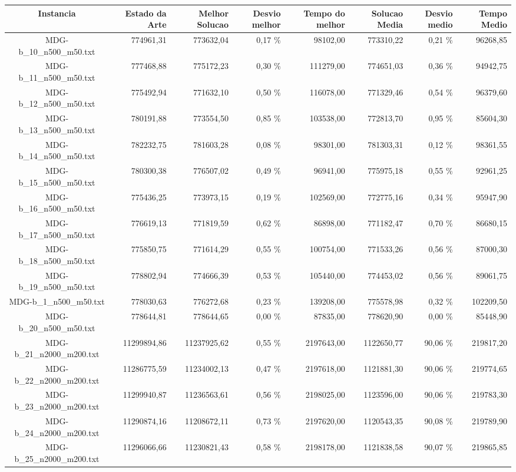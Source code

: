\begin{landscape}
	\begin{table}[ht]
	\centering
	\begin{tabular}{| c | r | r | r | r | r | r | r |  }
\hline
Instancia&Estado da Arte&Melhor Solucao&Desvio melhor&Tempo do melhor&Solucao Media&Desvio medio&Tempo Medio\\ \hline 
		MDG-b\_10\_n500\_m50.txt&774961,31&773632,04&0,17 \%&98102,00&773310,22&0,21 \%&96268,85\\
		MDG-b\_11\_n500\_m50.txt&777468,88&775172,23&0,30 \%&111279,00&774651,03&0,36 \%&94942,75\\
		MDG-b\_12\_n500\_m50.txt&775492,94&771632,10&0,50 \%&116078,00&771329,46&0,54 \%&96379,60\\
		MDG-b\_13\_n500\_m50.txt&780191,88&773554,50&0,85 \%&103538,00&772813,70&0,95 \%&85604,30\\
		MDG-b\_14\_n500\_m50.txt&782232,75&781603,28&0,08 \%&98301,00&781303,31&0,12 \%&98361,55\\
		MDG-b\_15\_n500\_m50.txt&780300,38&776507,02&0,49 \%&96941,00&775975,18&0,55 \%&92961,25\\
		MDG-b\_16\_n500\_m50.txt&775436,25&773973,15&0,19 \%&102569,00&772775,16&0,34 \%&95947,90\\
		MDG-b\_17\_n500\_m50.txt&776619,13&771819,59&0,62 \%&86898,00&771182,47&0,70 \%&86680,15\\
		MDG-b\_18\_n500\_m50.txt&775850,75&771614,29&0,55 \%&100754,00&771533,26&0,56 \%&87000,30\\
		MDG-b\_19\_n500\_m50.txt&778802,94&774666,39&0,53 \%&105440,00&774453,02&0,56 \%&89061,75\\
		MDG-b\_1\_n500\_m50.txt&778030,63&776272,68&0,23 \%&139208,00&775578,98&0,32 \%&102209,50\\
		MDG-b\_20\_n500\_m50.txt&778644,81&778644,65&0,00 \%&87835,00&778620,90&0,00 \%&85448,90\\
		MDG-b\_21\_n2000\_m200.txt&11299894,86&11237925,62&0,55 \%&2197643,00&1122650,77&90,06 \%&219817,20\\
		MDG-b\_22\_n2000\_m200.txt&11286775,59&11234002,13&0,47 \%&2197618,00&1121881,30&90,06 \%&219774,65\\
		MDG-b\_23\_n2000\_m200.txt&11299940,87&11236563,61&0,56 \%&2198025,00&1123596,00&90,06 \%&219783,30\\
		MDG-b\_24\_n2000\_m200.txt&11290874,16&11208672,11&0,73 \%&2197620,00&1120543,35&90,08 \%&219789,90\\
		MDG-b\_25\_n2000\_m200.txt&11296066,66&11230821,43&0,58 \%&2198178,00&1121838,58&90,07 \%&219865,85\\

\end{tabular}
\end{table}
\end{landscape}
